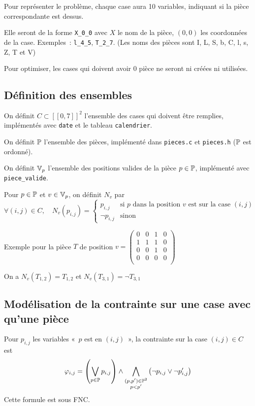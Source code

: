 Pour représenter le problème, chaque case aura 10 variables,
indiquant si la pièce correspondante est dessus.

Elle seront de la forme \verb|X_0_0| avec $X$ le nom de la pièce, $(0,0)$ les
coordonnées de la case.
Exemples~: \verb|l_4_5|, \verb|T_2_7|. (Les noms des pièces sont I, L, S, b, C,
l, s, Z, T et V)

Pour optimiser, les cases qui doivent avoir 0 pièce ne seront ni créées ni
utilisées.

\subsection{Définition des ensembles}
On définit $C \subset [\![0,7]\!]^2$ l'ensemble des cases qui doivent être
remplies, implémentés avec \verb|date| et le tableau \verb|calendrier|.

On définit $\mathbb{P}$ l'ensemble des pièces, implémenté dans \verb|pieces.c| et
\verb|pieces.h| ($\mathbb{P}$ est ordonné).

On définit $\mathbb{V}_p$ l'ensemble des positions valides de la pièce $p\in\mathbb{P}$,
implémenté avec \verb|piece_valide|.

Pour $p\in\mathbb{P}$ et $v\in\mathbb{V}_p$, on définit $N_v$ par
\begin{equation*}
    \forall (i,j)\in C,\quad N_v(p_{i,j}) =
        \begin{cases}
            p_{i,j} & \text{si $p$ dans la position $v$ est sur la case $(i,j)$}\\
            \lnot p_{i,j} & \text{sinon}
        \end{cases}
\end{equation*}

Exemple pour la pièce $T$ de position $v =
    \begin{pmatrix}
        0 & 0 & 1 & 0 \\
        1 & 1 & 1 & 0 \\
        0 & 0 & 1 & 0 \\
        0 & 0 & 0 & 0 \\
    \end{pmatrix}$

On a $N_v(T_{1,2}) = T_{1,2}$ et $N_v(T_{3,1}) = \lnot T_{3,1}$

\subsection{Modélisation de la contrainte sur une case avec qu'une pièce}
Pour $p_{i,j}$ les variables «~$p$ est en $(i,j)$~», la contrainte sur la case
$(i,j)\in C$ est
\begin{equation*}
    \varphi_{i,j} = \left(\bigvee_{p\in\mathbb{P}} p_{i,j} \right) \land
                    \bigwedge_{\substack{(p,p')\in\mathbb{P}^2\\p<p'}}\left(\lnot p_{i,j} \lor \lnot p'_{i,j}\right)
\end{equation*}
Cette formule est sous FNC.

